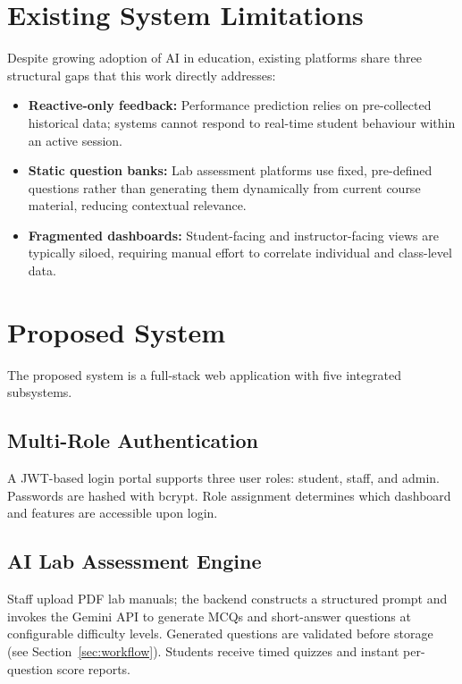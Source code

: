 \documentclass[conference]{IEEEtran}
\begin{document}
\section{Existing System Limitations}
\label{sec:limits}

Despite growing adoption of AI in education, existing platforms share three structural gaps that this work directly addresses:

\begin{itemize}
  \item \textbf{Reactive-only feedback:} Performance prediction relies on pre-collected historical data; systems cannot respond to real-time student behaviour within an active session.
  \item \textbf{Static question banks:} Lab assessment platforms use fixed, pre-defined questions rather than generating them dynamically from current course material, reducing contextual relevance.
  \item \textbf{Fragmented dashboards:} Student-facing and instructor-facing views are typically siloed, requiring manual effort to correlate individual and class-level data.
\end{itemize}

\section{Proposed System}
\label{sec:proposed}

The proposed system is a full-stack web application with five integrated subsystems.

\subsection{Multi-Role Authentication}
A JWT-based login portal supports three user roles: student, staff, and admin. Passwords are hashed with bcrypt. Role assignment determines which dashboard and features are accessible upon login.

\subsection{AI Lab Assessment Engine}
Staff upload PDF lab manuals; the backend constructs a structured prompt and invokes the Gemini API to generate MCQs and short-answer questions at configurable difficulty levels. Generated questions are validated before storage (see Section~\ref{sec:workflow}). Students receive timed quizzes and instant per-question score reports.
\end{document}
